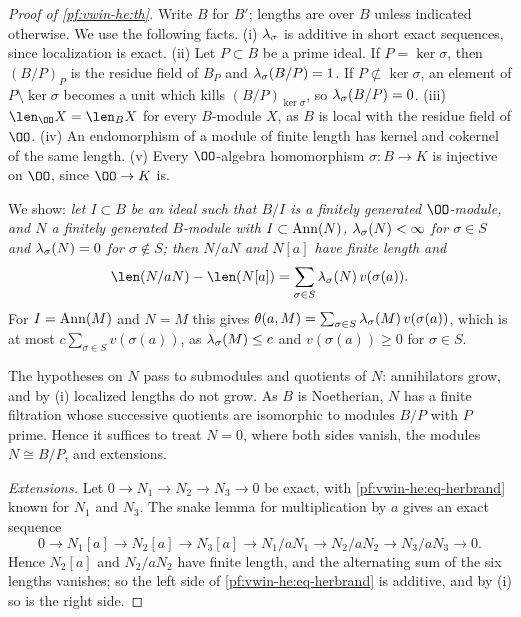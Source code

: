\begin{proof}[Proof of \cref{pf:vwin-he:th}]
Write $B$ for $B'$; lengths are over $B$ unless indicated otherwise. We use the following facts.
(i) $\lambda_\sigma$ is additive in short exact sequences, since localization is exact.
(ii) Let $P\subset B$ be a prime ideal. If $P=\ker\sigma$, then $(B/P)_P$ is the residue field of $B_P$ and
$\lambda_\sigma(B/P)=1$. If $P\not\subset\ker\sigma$, an element of $P\setminus\ker\sigma$ becomes a unit which
kills $(B/P)_{\ker\sigma}$, so $\lambda_\sigma(B/P)=0$.
(iii) $\len_\OO X=\len_BX$ for every $B$-module $X$, as $B$ is local with the residue field of $\OO$.
(iv) An endomorphism of a module of finite length has kernel and cokernel of the same length.
(v) Every $\OO$-algebra homomorphism $\sigma:B\to K$ is injective on $\OO$, since $\OO\to K$ is.

We show: \emph{let $I\subset B$ be an ideal such that $B/I$ is a finitely generated $\OO$-module, and $N$ a finitely
generated $B$-module with $I\subset\operatorname{Ann}(N)$, $\lambda_\sigma(N)<\infty$ for $\sigma\in S$ and
$\lambda_\sigma(N)=0$ for $\sigma\notin S$; then $N/aN$ and $N[a]$ have finite length and}
\begin{equation}\label{pf:vwin-he:eq-herbrand}
 \len(N/aN)-\len(N[a])=\sum_{\sigma\in S}\vwinheloclen_\sigma(N)\,v(\sigma(a)).
\end{equation}
For $I=\operatorname{Ann}(M)$ and $N=M$ this gives $\theta(a,M)=\sum_{\sigma\in S}\lambda_\sigma(M)\,v(\sigma(a))$,
which is at most $c\sum_{\sigma\in S}v(\sigma(a))$, as $\lambda_\sigma(M)\le c$ and $v(\sigma(a))\ge0$ for
$\sigma\in S$.

The hypotheses on $N$ pass to submodules and quotients of $N$: annihilators grow, and by (i) localized lengths do not
grow. As $B$ is Noetherian, $N$ has a finite filtration whose successive quotients are isomorphic to modules $B/P$
with $P$ prime. Hence it suffices to treat $N=0$, where both sides vanish, the modules $N\cong B/P$, and extensions.

\emph{Extensions.} Let $0\to N_1\to N_2\to N_3\to0$ be exact, with \eqref{pf:vwin-he:eq-herbrand} known for $N_1$ and
$N_3$. The snake lemma for multiplication by $a$ gives an exact sequence
\[
 0\to N_1[a]\to N_2[a]\to N_3[a]\to N_1/aN_1\to N_2/aN_2\to N_3/aN_3\to0 .
\]
Hence $N_2[a]$ and $N_2/aN_2$ have finite length, and the alternating sum of the six lengths vanishes; so the left
side of \eqref{pf:vwin-he:eq-herbrand} is additive, and by (i) so is the right side.


\end{proof}
